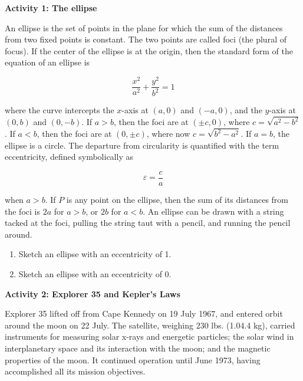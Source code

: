 {\noindent \bf Activity 1: The ellipse} 

 An ellipse is the set of points in the plane for which the sum of the distances from two fixed points is constant. The two points are called foci (the plural of focus). If the center of the ellipse is at the origin, then the standard form of the equation of an ellipse is

\begin{equation} \frac{x^2}{a^2} + \frac{y^2}{b^2} = 1 \end{equation}

\noindent where the curve intercepts the $x$-axis at $(a,0)$ and $(-a,0)$, and the $y$-axis at $(0,b)$ and $(0,-b)$. If $a > b$, then the foci are at $(\pm c,0)$, where $c = \sqrt{a^2 - b^2}$. If $a < b$, then the foci are at $(0,\pm c)$, where now $c = \sqrt{b^2 - a^2}$. If $a = b$, the ellipse is a circle. The departure from circularity is quantified with the term eccentricity, defined symbolically as

\begin{equation} \varepsilon = \frac{c}{a} \end{equation}

\noindent when $a > b$. If $P$ is any point on the ellipse, then the sum of its distances from the foci is $2a$ for $a > b$, or $2b$ for $a < b$. An ellipse can be drawn with a string tacked at the foci, pulling the string taut with a pencil, and running the pencil around. 

\pagebreak[2]
\begin{enumerate}

\item Sketch an ellipse with an eccentricity of 1.

\vskip35pt

\item Sketch an ellipse with an eccentricity of 0.

\vskip35pt

\end{enumerate}

{\noindent \bf Activity 2: Explorer 35 and Kepler's Laws}

 Explorer 35 lifted off from Cape Kennedy on 19 July 1967, and entered orbit around the moon on 22 July. The satellite, weighing 230 lbs. (1.04.4 kg), carried instruments for measuring solar x-rays and energetic particles; the solar wind in interplanetary space and its interaction with the moon; and the magnetic properties of the moon. It continued operation until June 1973, having accomplished all its mission objectives.

